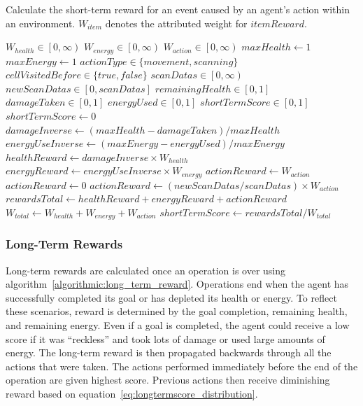 \begin{algorithm}
  \caption{Calculate the short-term reward for an event caused by an agent's action within an environment. $W_{item}$ denotes the attributed weight for $itemReward$.}
  \begin{algorithmic} \label{algorithmic:short_term_reward}
    \REQUIRE $W_{health} \in \left[0, \infty \right)$
    \REQUIRE $W_{energy} \in \left[0, \infty \right)$
    \REQUIRE $W_{action} \in \left[0, \infty \right)$
    \REQUIRE $maxHealth \leftarrow 1$
    \REQUIRE $maxEnergy \leftarrow 1$
    \REQUIRE $actionType \in \{movement, scanning\}$
    \REQUIRE $cellVisitedBefore \in \{true, false\}$
    \REQUIRE $scanDatas \in \left[0, \infty \right)$
    \REQUIRE $newScanDatas \in \left[0, scanDatas \right]$
    \REQUIRE $remainingHealth \in \left[0, 1 \right]$
    \REQUIRE $damageTaken \in \left[0, 1 \right]$
    \REQUIRE $energyUsed \in \left[0, 1 \right]$
    \ENSURE $shortTermScore \in \left[0, 1 \right]$
      \RETURN $shortTermScore \leftarrow 0$
    \ELSE
      \STATE $damageInverse \leftarrow (maxHealth - damageTaken) / maxHealth$
      \STATE $energyUseInverse \leftarrow (maxEnergy - energyUsed) / maxEnergy$
      \STATE $healthReward \leftarrow damageInverse \times W_{health}$
      \STATE $energyReward \leftarrow energyUseInverse \times W_{energy}$
          \STATE $actionReward \leftarrow W_{action}$
        \ELSE
          \STATE $actionReward \leftarrow 0$
        \ENDIF
      \ELSE
        \STATE $actionReward \leftarrow (newScanDatas / scanDatas) \times W_{action}$
      \ENDIF
      \STATE $rewardsTotal \leftarrow healthReward + energyReward + actionReward$
      \STATE $W_{total} \leftarrow W_{health} + W_{energy} + W_{action}$
      \RETURN $shortTermScore \leftarrow rewardsTotal / W_{total}$
    \ENDIF
  \end{algorithmic}
\end{algorithm}


\subsubsection{Long-Term Rewards}
Long-term rewards are calculated once an operation is over using algorithm~\ref{algorithmic:long_term_reward}.
Operations end when the agent has successfully completed its goal or has depleted its health or energy.
To reflect these scenarios, reward is determined by the goal completion, remaining health, and remaining energy.
Even if a goal is completed, the agent could receive a low score if it was ``reckless'' and took lots of damage or used large amounts of energy.
The long-term reward is then propagated backwards through all the actions that were taken.
The actions performed immediately before the end of the operation are given highest score.
Previous actions then receive diminishing reward based on equation~\ref{eq:longtermscore_distribution}.

